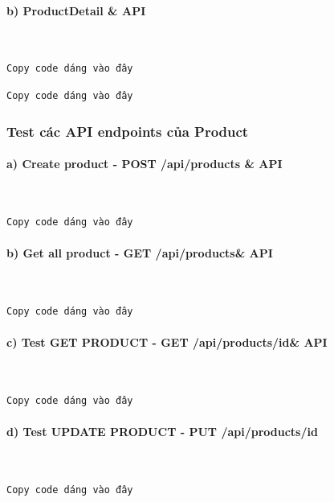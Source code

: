 \documentclass[a4paper,12pt]{article}
\begin{document}
\paragraph{b) ProductDetail \& API }\mbox{}\\
\begin{lstlisting}[language=javaScript, caption= Form Product detail
]
    Copy code dáng vào đây
\end{lstlisting}
\begin{lstlisting}[language=javaScript, caption= Form sửa sản phẩm
]
    Copy code dáng vào đây
\end{lstlisting}

\subsubsection{Test các API endpoints của Product}
\paragraph{a) Create product - POST /api/products \& API }\mbox{}\\
\begin{lstlisting}[language=javaScript, caption= Viết mô tả code
]
    Copy code dáng vào đây
\end{lstlisting}
\paragraph{b) Get all product - GET /api/products\& API }\mbox{}\\
\begin{lstlisting}[language=javaScript, caption= Viết mô tả code
]
    Copy code dáng vào đây
\end{lstlisting}

\paragraph{c) Test GET PRODUCT - GET /api/products/{id}\& API }\mbox{}\\
\begin{lstlisting}[language=javaScript, caption= Viết mô tả code
]
    Copy code dáng vào đây
\end{lstlisting}

\paragraph{d) 
Test UPDATE PRODUCT - PUT /api/products/{id} }\mbox{}\\
\begin{lstlisting}[language=javaScript, caption= Viết mô tả code
]
    Copy code dáng vào đây
\end{lstlisting}
\end{document}
